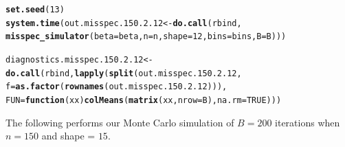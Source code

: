 \documentclass[11pt]{article}\usepackage[]{graphicx}\usepackage[]{color}
\makeatletter
\newcommand{\hlnum}[1]{\textcolor[rgb]{0.686,0.059,0.569}{#1}}%
\newcommand{\hlstd}[1]{\textcolor[rgb]{0.345,0.345,0.345}{#1}}%
\newcommand{\hlkwa}[1]{\textcolor[rgb]{0.161,0.373,0.58}{\textbf{#1}}}%
\newcommand{\hlkwb}[1]{\textcolor[rgb]{0.69,0.353,0.396}{#1}}%
\newcommand{\hlkwc}[1]{\textcolor[rgb]{0.333,0.667,0.333}{#1}}%
\newcommand{\hlkwd}[1]{\textcolor[rgb]{0.737,0.353,0.396}{\textbf{#1}}}%
\newenvironment{kframe}{%
 \def\at@end@of@kframe{}%
 \ifinner\ifhmode%
  \def\at@end@of@kframe{\end{minipage}}%
  \begin{minipage}{\columnwidth}%
 \fi\fi%
 \def\FrameCommand##1{\hskip\@totalleftmargin \hskip-\fboxsep
 \colorbox{shadecolor}{##1}\hskip-\fboxsep
     \hskip-\linewidth \hskip-\@totalleftmargin \hskip\columnwidth}%
 \MakeFramed {\advance\hsize-\width
   \@totalleftmargin\z@ \linewidth\hsize
   \@setminipage}}%
 {\par\unskip\endMakeFramed%
 \at@end@of@kframe}
\newenvironment{knitrout}{}{} %
\makeatother
\begin{document}
\begin{knitrout}
\color{fgcolor}\begin{kframe}
\begin{alltt}
\hlkwd{set.seed}\hlstd{(}\hlnum{13}\hlstd{)}
\hlkwd{system.time}\hlstd{(out.misspec.150.2.12} \hlkwb{<-} \hlkwd{do.call}\hlstd{(rbind,}
  \hlkwd{misspec_simulator}\hlstd{(}\hlkwc{beta} \hlstd{= beta,} \hlkwc{n} \hlstd{= n,} \hlkwc{shape} \hlstd{=} \hlnum{12}\hlstd{,} \hlkwc{bins} \hlstd{= bins,} \hlkwc{B} \hlstd{= B)))}
\end{alltt}


{\ttfamily\noindent\bfseries\color{errorcolor}{\#\# Error in chol.default(crossprod(x) + lambda[j] * diag(v)): the leading minor of order 5 is not positive definite}}

{\ttfamily\noindent\itshape\color{messagecolor}{\#\# Timing stopped at: 0.671 0 0.671}}\begin{alltt}
\hlstd{diagnostics.misspec.150.2.12} \hlkwb{<-} \hlkwd{do.call}\hlstd{(rbind,} \hlkwd{lapply}\hlstd{(}\hlkwd{split}\hlstd{(out.misspec.150.2.12,}
  \hlkwc{f} \hlstd{=} \hlkwd{as.factor}\hlstd{(}\hlkwd{rownames}\hlstd{(out.misspec.150.2.12))),}
  \hlkwc{FUN} \hlstd{=} \hlkwa{function}\hlstd{(}\hlkwc{xx}\hlstd{)} \hlkwd{colMeans}\hlstd{(}\hlkwd{matrix}\hlstd{(xx,} \hlkwc{nrow} \hlstd{= B),} \hlkwc{na.rm} \hlstd{=} \hlnum{TRUE}\hlstd{)))}
\end{alltt}


{\ttfamily\noindent\bfseries\color{errorcolor}{\#\# Error in split(out.misspec.150.2.12, f = as.factor(rownames(out.misspec.150.2.12))): object 'out.misspec.150.2.12' not found}}\end{kframe}
\end{knitrout}


The following performs our Monte Carlo simulation of $B = 200$ iterations 
when $n = 150$ and shape = $15$.
\end{document}
